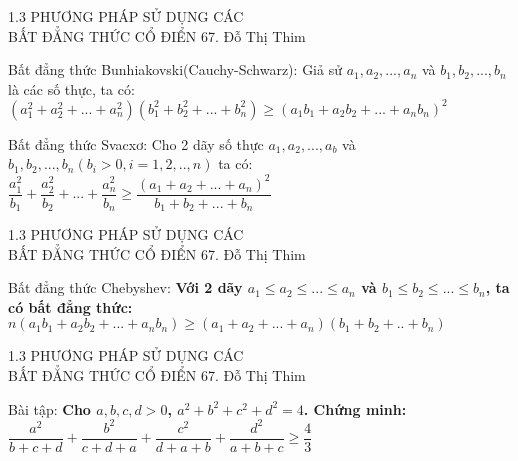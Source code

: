 \begin{frame}{1.3 PHƯƠNG PHÁP SỬ DỤNG CÁC \\ BẤT ĐẲNG THỨC CỔ ĐIỂN \hspace{4.5cm}  67. Đỗ Thị Thim} 
\begin{block}{Bất đẳng thức Bunhiakovski(Cauchy-Schwarz):}
      \hspace{0.5cm}
       Giả sử $a_1,a_2,...,a_n$ và $b_1,b_2,...,b_n$ là các số thực, ta có:\\$(a_1^{2}+a_2^{2}+...+a_n^{2})(b_1^{2}+b_2^{2}+...+b_n^{2})\geq(a_1b_1+a_2b_2+...+a_nb_n)^2$
       \end{block}
       \begin{block}{Bất đẳng thức Svacxơ:}
            \hspace{0.5cm}
        Cho 2 dãy số thực $a_1,a_2,...,a_b$ và $ b_1,b_2,...,b_n(b_i>0,i=1,2,..,n)$ ta có:\\$\dfrac{a_1^{2}}{b_1}+\dfrac {a_2^{2}}{b_2}+...+\dfrac{a_n^{2}}{b_n}\geq\dfrac{(a_1+a_2+...+a_n)^2}{b_1+b_2+...+b_n}$
\end{block} 
\end{frame} 

\begin{frame}{1.3 PHƯƠNG PHÁP SỬ DỤNG CÁC \\ BẤT ĐẲNG THỨC CỔ ĐIỂN \hspace{4.5cm}  67. Đỗ Thị Thim} 
\begin{block}{Bất đẳng thức Chebyshev:}
\textbf{Với 2 dãy $a_1\leq a_2\leq ...\leq a_n$ và $b_1\leq b_2\leq...\leq b_n$, ta có bất đẳng thức:\\$n(a_1b_1+a_2b_2+...+a_nb_n)\geq (a_1+a_2+...+a_n)(b_1+b_2+..+b_n)$}
\end{block} 
\end{frame} 

\begin{frame}{1.3 PHƯƠNG PHÁP SỬ DỤNG CÁC \\ BẤT ĐẲNG THỨC CỔ ĐIỂN \hspace{4.5cm}  67. Đỗ Thị Thim} 
\begin{block}{Bài tập:}
\textbf{Cho $a,b,c,d>0$, $a^2+b^2+c^2+d^2=4$. Chứng minh:\\$\dfrac{a^2}{b+c+d}+\dfrac{b^2}{c+d+a}+\dfrac{c^2}{d+a+b}+\dfrac{d^2}{a+b+c}\geq \dfrac{4}{3}$}
\end{block} 
\end{frame} 

